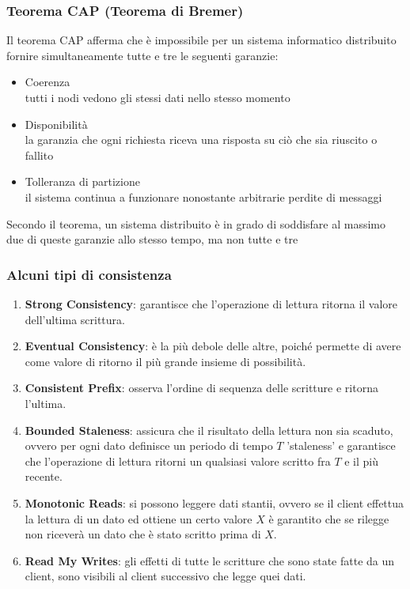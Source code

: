 \begin{frame}
\frametitle{Teorema CAP (Teorema di Bremer)}
	\begin{definizione}
	 Il \alert{teorema CAP} afferma che è impossibile per un sistema informatico distribuito fornire simultaneamente tutte e tre le seguenti garanzie:
	\begin{itemize}
		\item Coerenza\\
		tutti i nodi vedono gli stessi dati nello stesso momento
		\item Disponibilità\\
	    la garanzia che ogni richiesta riceva una risposta su ciò che sia riuscito o fallito
		\item Tolleranza di partizione\\
		il sistema continua a funzionare nonostante arbitrarie perdite di messaggi
	\end{itemize}
	Secondo il teorema, un sistema distribuito è in grado di soddisfare al massimo due di queste garanzie allo stesso tempo, ma non tutte e tre
	\end{definizione}
\end{frame}

\begin{frame}
\frametitle{Alcuni tipi di consistenza}
\begin{enumerate}
  \item \textbf{Strong Consistency}: garantisce che l'operazione di lettura ritorna il valore dell'ultima scrittura.
  \item \textbf{Eventual Consistency}: è la più debole delle altre, poiché permette di avere come valore di ritorno il più grande insieme di possibilità.
  \item \textbf{Consistent Prefix}: osserva l'ordine di sequenza delle scritture e ritorna l'ultima.
  \item \textbf{Bounded Staleness}: assicura che il risultato della lettura non sia scaduto, ovvero per ogni dato definisce un periodo di tempo $T$ 'staleness' e garantisce che l'operazione di lettura ritorni un qualsiasi valore scritto fra $T$ e il più recente.
  \item \textbf{Monotonic Reads}: si possono leggere dati stantii, ovvero se il client effettua la lettura di un dato ed ottiene un certo valore $X$ è garantito che se rilegge non riceverà un dato che è stato scritto prima di $X$. 
  \item \textbf{Read My Writes}: gli effetti di tutte le scritture che sono state fatte da un client, sono visibili al client successivo che legge quei dati.
\end{enumerate}
\end{frame}

